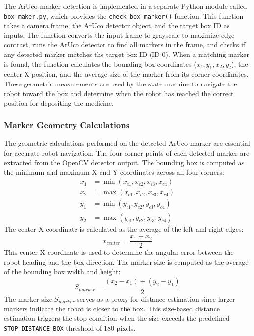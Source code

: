 \documentclass[12pt,a4paper,oneside]{report}
\begin{document}
The ArUco marker detection is implemented in a separate Python module called \texttt{box\_maker.py}, which provides the \texttt{check\_box\_marker()} function. This function takes a camera frame, the ArUco detector object, and the target box ID as inputs. The function converts the input frame to grayscale to maximize edge contrast, runs the ArUco detector to find all markers in the frame, and checks if any detected marker matches the target box ID (ID 0). When a matching marker is found, the function calculates the bounding box coordinates ($x_1, y_1, x_2, y_2$), the center X position, and the average size of the marker from its corner coordinates. These geometric measurements are used by the state machine to navigate the robot toward the box and determine when the robot has reached the correct position for depositing the medicine.

\subsubsection{Marker Geometry Calculations}\label{marker-geometry-calculations}

The geometric calculations performed on the detected ArUco marker are essential for accurate robot navigation. The four corner points of each detected marker are extracted from the OpenCV detector output. The bounding box is computed as the minimum and maximum X and Y coordinates across all four corners:
\begin{align}
x_1 &= \min(x_{c1}, x_{c2}, x_{c3}, x_{c4}) \\
x_2 &= \max(x_{c1}, x_{c2}, x_{c3}, x_{c4}) \\
y_1 &= \min(y_{c1}, y_{c2}, y_{c3}, y_{c4}) \\
y_2 &= \max(y_{c1}, y_{c2}, y_{c3}, y_{c4})
\end{align}
The center X coordinate is calculated as the average of the left and right edges:
\begin{equation}
x_{center} = \frac{x_1 + x_2}{2}
\end{equation}
This center X coordinate is used to determine the angular error between the robot heading and the box direction. The marker size is computed as the average of the bounding box width and height:
\begin{equation}
S_{marker} = \frac{(x_2 - x_1) + (y_2 - y_1)}{2}
\end{equation}
The marker size $S_{marker}$ serves as a proxy for distance estimation since larger markers indicate the robot is closer to the box. This size-based distance estimation triggers the stop condition when the size exceeds the predefined \texttt{STOP\_DISTANCE\_BOX} threshold of 180 pixels.
\end{document}
